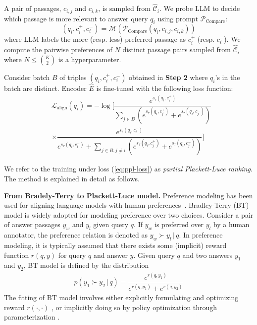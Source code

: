  A pair of passages, $c_{i,j}$ and $c_{i,k}$, is sampled from $\hat{\mathcal{C}}_i$. We probe LLM to decide which passage is more relevant to answer query $q_i$ using prompt $\mathcal{P}_{\mathrm{Compare}}$:
\begin{equation}    \label{eq:placket}
    (q_i,c_i^+,c_i^-)= \mathcal{M}(\mathcal{P}_{\mathrm{Compare}}(q_i, c_{i,j}, c_{i,k}))
\end{equation}
where LLM labels the more (resp. less) preferred passage as $c_i^+$ (resp. $c_i^-$). We compute the pairwise preferences of $N$ distinct passage pairs sampled from $\hat{\mathcal C}_i$ where $N\leq {K \choose 2}$ is a hyperparameter.


 Consider batch $B$ of triples $(q_i, c_i^+, c_i^-)$ obtained in \textbf{Step 2} where $q_i$'s in the batch are distinct. Encoder $\hat E$ is fine-tuned with the following loss function:
 \begin{align}
        &\mathcal{L}_{\mathrm{align}}(q_i) = 
        -\log\Bigg[\dfrac{e^{s_{\tau}(q_i, c_i^+)}}{\sum\limits_{j\in B} \left(e^{s_{\tau}(q_i, c_j^+)} + e^{s_{\tau}(q_i, c_j^-)}\right)}\nonumber\\&\times\dfrac{e^{s_{\tau}(q_i, c_i^-)}}{e^{s_{\tau}(q_i, c_i^-)}+\sum\limits_{j\in B, j\neq i} \left(e^{s_{\tau}(q_i, c_j^+)} + e^{s_{\tau}(q_i, c_j^-)}\right)}\Bigg] \label{eq:ppl-loss}
    \end{align}

We refer to the training under loss (\ref{eq:ppl-loss}) as \emph{partial Plackett-Luce ranking}. The method is explained in detail as follows.  

\noindent\textbf{From Bradely-Terry to Plackett-Luce model.} Preference modeling has been used for aligning language models with human preferences~\cite{ouyang2022training, rafailov2024direct}. Bradley-Terry (BT) model \cite{bradley1952rank} is widely adopted for modeling preference over two choices.  Consider a pair of answer passages $y_w$ and $y_l$ given query $q$. If $y_w$ is preferred over $y_l$ by a human annotator, the preference relation is denoted as $y_w\succ y_l\, |\, q$. In preference modeling, it is typically assumed that there exists some (implicit) reward function $r(q,y)$ for query $q$ and answer $y$. Given query $q$ and two answers $y_1$ and $y_2$,  BT model is defined by the distribution
\begin{align}\label{eq:pair}
     p(y_1 \succ y_2 \, |\, q) = \dfrac{e^{r(q, y_1)}}{e^{r(q, y_1)} + e^{r(q, y_2)}} 
\end{align}
The fitting of BT model involves either explicitly formulating and optimizing reward $r(\cdot,\cdot)$ \cite{ziegler2019fine,ouyang2022training}, or implicitly doing so by policy optimization through parameterization \cite{rafailov2024direct}.


